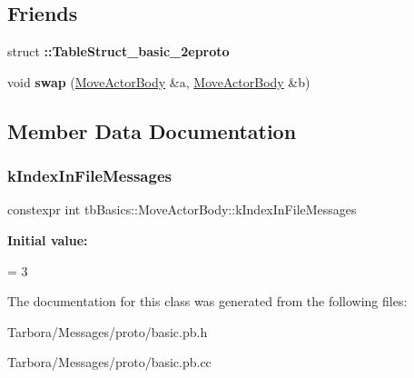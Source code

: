 \subsection*{Friends}
\begin{DoxyCompactItemize}
\item 
\mbox{\label{classtbBasics_1_1MoveActorBody_ae86a2f4c520666b65d606ccbe2122e61}} 
struct {\bfseries \+::\+Table\+Struct\+\_\+basic\+\_\+2eproto}
\item 
\mbox{\label{classtbBasics_1_1MoveActorBody_af388898615e8bdffffda7b3599f21656}} 
void {\bfseries swap} (\hyperlink{classtbBasics_1_1MoveActorBody}{Move\+Actor\+Body} \&a, \hyperlink{classtbBasics_1_1MoveActorBody}{Move\+Actor\+Body} \&b)
\end{DoxyCompactItemize}


\subsection{Member Data Documentation}
\mbox{\label{classtbBasics_1_1MoveActorBody_abfa222b1b06874a19a06b8b78982a14d}} 
\subsubsection{\texorpdfstring{k\+Index\+In\+File\+Messages}{kIndexInFileMessages}}
{\footnotesize\ttfamily constexpr int tb\+Basics\+::\+Move\+Actor\+Body\+::k\+Index\+In\+File\+Messages\hspace{0.3cm}{\ttfamily [static]}}

{\bfseries Initial value\+:}
\begin{DoxyCode}
=
    3
\end{DoxyCode}


The documentation for this class was generated from the following files\+:\begin{DoxyCompactItemize}
\item 
Tarbora/\+Messages/proto/basic.\+pb.\+h\item 
Tarbora/\+Messages/proto/basic.\+pb.\+cc\end{DoxyCompactItemize}
